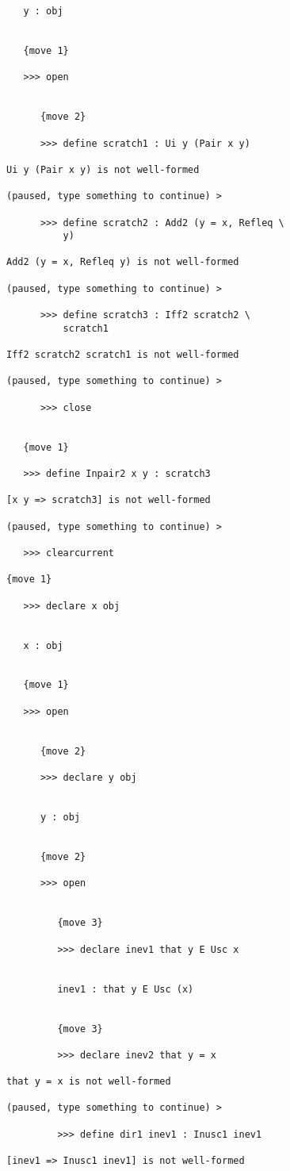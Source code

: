 \documentclass[12pt]{article}
\begin{document}
\begin{verbatim}
   y : obj


   {move 1}

   >>> open


      {move 2}

      >>> define scratch1 : Ui y (Pair x y)

Ui y (Pair x y) is not well-formed

(paused, type something to continue) >

      >>> define scratch2 : Add2 (y = x, Refleq \
          y)

Add2 (y = x, Refleq y) is not well-formed

(paused, type something to continue) >

      >>> define scratch3 : Iff2 scratch2 \
          scratch1

Iff2 scratch2 scratch1 is not well-formed

(paused, type something to continue) >

      >>> close


   {move 1}

   >>> define Inpair2 x y : scratch3

[x y => scratch3] is not well-formed

(paused, type something to continue) >

   >>> clearcurrent

{move 1}

   >>> declare x obj


   x : obj


   {move 1}

   >>> open


      {move 2}

      >>> declare y obj


      y : obj


      {move 2}

      >>> open


         {move 3}

         >>> declare inev1 that y E Usc x


         inev1 : that y E Usc (x)


         {move 3}

         >>> declare inev2 that y = x

that y = x is not well-formed

(paused, type something to continue) >

         >>> define dir1 inev1 : Inusc1 inev1

[inev1 => Inusc1 inev1] is not well-formed


\end{verbatim}
\end{document}
